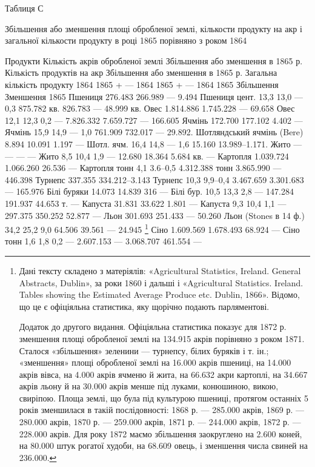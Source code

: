 
Таблиця С

Збільшення або зменшення площі обробленої землі, кількости продукту на акр і загальної кількости
продукту в році 1865 порівняно з роком 1864

Продукти    Кількість акрів обробленої землі        Збільшення або зменшення в 1865 р. Кількість
продуктів на акр            Збільшення або зменшення в 1865 р. Загальна кількість продукту
    1864    1865 + — 1864        1865 + — 1864        1865    Збільшення    Зменшення 1865
Пшениця             276.483           266.989  — 9.494
Пшениця цент.    13,3    13,0 — 0,3    875.782    кв.    826.783    —   48.999 кв.
Овес                              1.814.886       1.745.228   —   69.658
Овес    12,1    12,3    0,2  —   7.826.332   7.659.727   —   166.605
Ячмінь                           172.700           177.102             4.402 —
Ячмінь     15,9    14,9    —   1,0    761.909        732.017  —  29.892.
Шотляндський ячмінь (Bere)    8.894    10.091    1.197   —
Шотл. ячм. 16,4    14,8  —  1,6    15.160        13.989--1.171.
Жито    —    —    —     —
Жито 8,5    10,4    1,9   —   12.680 18.364    5.684 кв. —
Картопля       1.039.724      1.066.260            26.536 —
Картопля тонн    4,1    3.6--0,5    4.312.388   тонн    3.865.990    —    446.398
Турнепс                      337.355    334.212--3.143
Турнепс 10,3    9,9--0,4    3.467.659        3.301.683     —     165.976
Білі буряки 14.073    14.839    316        —
Білі бур. 10,5    13,3    2,8     —     147.284     191.937    44.653 т.     —
Капуста        31.831    33.622    1.801 —
Капуста    9,3    10,4    1,1    —     297.375        350.252    52.877 —
Льон        301.693    251.433       —      50.260
Льон (Stones в 14 ф.) 34,2        25,2            9,0    64.506        39.561    —  24.945 \footnote{
Дані тексту складено з матеріялів: «Agricultural Statistics, Ireland. General Abstracts,
Dublin», за роки 1860 і дальші і «Agricultural Statistics. Ireland. Tables showing the Estimated
Average Produce etc. Dublin, 1866».
Відомо, що це є офіціяльна статистика, яку щорічно подають парляментові.

Додаток до другого видання. Офіціяльна статистика показує для 1872 р. зменшення площі обробленої
землі на 134.915 акрів порівняно з роком 1871. Сталося «збільшення» зеленини — турнепсу, білих
буряків і т. ін.; «зменшення» площі обробленої землі на 16.000 акрів пшениці, на 14.000 акрів вівса,
на 4.000 акрів ячменю й жита, на 66.632 акри картоплі, на 34.667 акрів льону й на 30.000 акрів менше
під луками, конюшиною, викою, свиріпою. Площа землі, що була під культурою пшениці, протягом
останніх 5 років зменшилася в такій послідовності: 1868 р. — 285.000 акрів, 1869 р. — 280.000 акрів,
1870 р. — 259.000 акрів, 1871 р. — 244.000 акрів, 1872 р. — 228.000 акрів. Для року 1872 маємо
збільшення заокруглено на 2.600 коней, на 80.000 штук рогатої худоби, на 68.609 овець, і зменшення
числа свиней на 236.000.
}
Сіно        1.609.569    1.678.493    68.924      —
Сіно тонн    1,6    1,8    0,2   —  2.607.153   —  3.068.707    461.554   —
